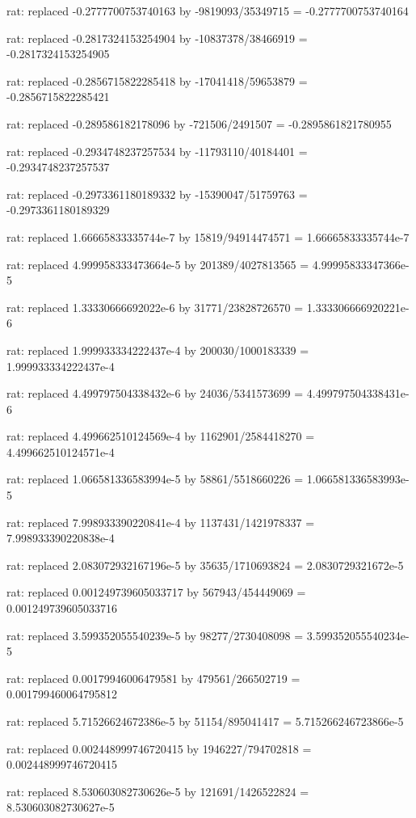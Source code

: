 \documentclass[a4paper,10pt]{article}
\begin{document}
\begin{eulernotebook}
\begin{eulercomment}
\begin{eulercomment}
\begin{eulercomment}
\begin{eulercomment}
\begin{eulercomment}
\begin{eulercomment}
\begin{eulercomment}
\begin{eulercomment}
\begin{eulercomment}
\begin{eulercomment}
\begin{eulercomment}
\begin{eulercomment}
\begin{eulercomment}
\begin{eulercomment}
\begin{eulercomment}
\begin{eulercomment}
\begin{euleroutput}
  rat: replaced -0.2777700753740163 by -9819093/35349715 = -0.2777700753740164
  
  rat: replaced -0.2817324153254904 by -10837378/38466919 = -0.2817324153254905
  
  rat: replaced -0.2856715822285418 by -17041418/59653879 = -0.2856715822285421
  
  rat: replaced -0.289586182178096 by -721506/2491507 = -0.2895861821780955
  
  rat: replaced -0.2934748237257534 by -11793110/40184401 = -0.2934748237257537
  
  rat: replaced -0.2973361180189332 by -15390047/51759763 = -0.2973361180189329
  
  rat: replaced 1.66665833335744e-7 by 15819/94914474571 = 1.66665833335744e-7
  
  rat: replaced 4.999958333473664e-5 by 201389/4027813565 = 4.99995833347366e-5
  
  rat: replaced 1.33330666692022e-6 by 31771/23828726570 = 1.333306666920221e-6
  
  rat: replaced 1.999933334222437e-4 by 200030/1000183339 = 1.999933334222437e-4
  
  rat: replaced 4.499797504338432e-6 by 24036/5341573699 = 4.499797504338431e-6
  
  rat: replaced 4.499662510124569e-4 by 1162901/2584418270 = 4.499662510124571e-4
  
  rat: replaced 1.066581336583994e-5 by 58861/5518660226 = 1.066581336583993e-5
  
  rat: replaced 7.998933390220841e-4 by 1137431/1421978337 = 7.998933390220838e-4
  
  rat: replaced 2.083072932167196e-5 by 35635/1710693824 = 2.0830729321672e-5
  
  rat: replaced 0.001249739605033717 by 567943/454449069 = 0.001249739605033716
  
  rat: replaced 3.599352055540239e-5 by 98277/2730408098 = 3.599352055540234e-5
  
  rat: replaced 0.00179946006479581 by 479561/266502719 = 0.001799460064795812
  
  rat: replaced 5.71526624672386e-5 by 51154/895041417 = 5.715266246723866e-5
  
  rat: replaced 0.002448999746720415 by 1946227/794702818 = 0.002448999746720415
  
  rat: replaced 8.530603082730626e-5 by 121691/1426522824 = 8.530603082730627e-5
  

\end{euleroutput}
\end{eulercomment}
\end{eulercomment}
\end{eulercomment}
\end{eulercomment}
\end{eulercomment}
\end{eulercomment}
\end{eulercomment}
\end{eulercomment}
\end{eulercomment}
\end{eulercomment}
\end{eulercomment}
\end{eulercomment}
\end{eulercomment}
\end{eulercomment}
\end{eulercomment}
\end{eulercomment}
\end{eulernotebook}
\end{document}
